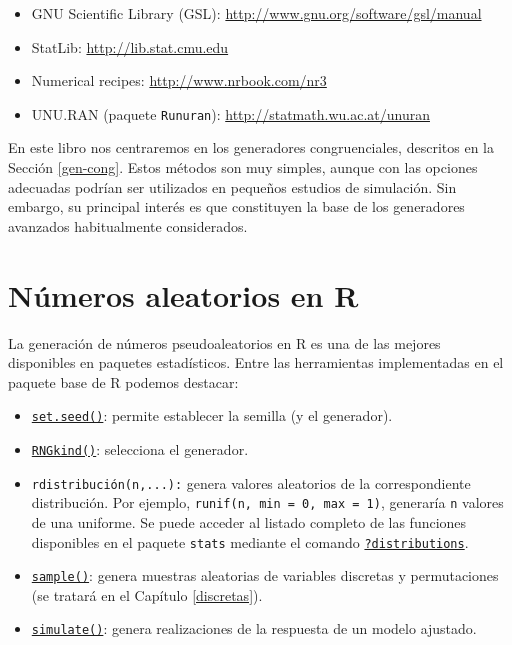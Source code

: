\documentclass[
  spanish,
  10pt,
]{book}
\theoremstyle{break}
\theoremstyle{nonumberplain}
\begin{document}
\begin{itemize}
\item
  GNU Scientific Library (GSL):
  \href{http://www.gnu.org/software/gsl/manual/html_node/Random-Number-Generation.html}{http://www.gnu.org/software/gsl/manual}
\item
  StatLib: \url{http://lib.stat.cmu.edu}
\item
  Numerical recipes: \url{http://www.nrbook.com/nr3}
\item
  UNU.RAN (paquete \texttt{Runuran}):
  \url{http://statmath.wu.ac.at/unuran}
\end{itemize}

En este libro nos centraremos en los generadores congruenciales, descritos en la Sección \ref{gen-cong}.
Estos métodos son muy simples, aunque con las opciones adecuadas podrían ser utilizados en pequeños estudios de simulación. Sin embargo, su principal interés es que constituyen la base de los generadores avanzados habitualmente considerados.

\section{Números aleatorios en R}\label{rrng}

La generación de números pseudoaleatorios en R es una de las mejores
disponibles en paquetes estadísticos.
Entre las herramientas implementadas en el paquete base de R podemos destacar:

\begin{itemize}
\item
  \href{https://rdrr.io/r/base/Random.html}{\texttt{set.seed()}}: permite establecer la semilla (y el generador).
\item
  \href{https://rdrr.io/r/base/Random.html}{\texttt{RNGkind()}}: selecciona el generador.
\item
  \texttt{rdistribución(n,...):} genera valores aleatorios de la correspondiente distribución.
  Por ejemplo, \texttt{runif(n,\ min\ =\ 0,\ max\ =\ 1)}, generaría \texttt{n} valores de una uniforme. Se puede acceder al listado completo de las funciones disponibles en el paquete \texttt{stats} mediante el comando \href{https://rdrr.io/r/stats/Distributions.html}{\texttt{?distributions}}.
\item
  \href{https://rdrr.io/r/base/sample.html}{\texttt{sample()}}: genera muestras aleatorias de variables discretas y permutaciones (se tratará en el Capítulo \ref{discretas}).
\item
  \href{https://rdrr.io/r/stats/simulate.html}{\texttt{simulate()}}: genera realizaciones de la respuesta de un modelo ajustado.
\end{itemize}
\end{document}

